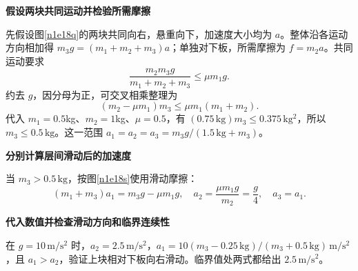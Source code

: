 \begin{solution}\textbf{假设两块共同运动并检验所需摩擦}\par\nobreak
先假设图\ref{n1e18q}的两块共同向右，悬重向下，加速度大小均为 $a$。整体沿各运动方向相加得 $m_3g=(m_1+m_2+m_3)a$；单独对下板，所需摩擦为 $f=m_2a$。共同运动要求
\[
 \frac{m_2m_3g}{m_1+m_2+m_3}\le\mu m_1g.
\]
约去 $g$，因分母为正，可交叉相乘整理为
\[
 (m_2-\mu m_1)m_3\le\mu m_1(m_1+m_2).
\]
代入 $m_1=0.5$kg、$m_2=1$kg、$\mu=0.5$，有 $(0.75\,\mathrm{kg})m_3\le0.375\,\mathrm{kg^2}$，所以 $m_3\le0.5\,\mathrm{kg}$。这一范围 $a_1=a_2=a_3=m_3g/(1.5\,\mathrm{kg}+m_3)$。



\par\medskip{}\noindent\textbf{分别计算层间滑动后的加速度}\par\nobreak
当 $m_3>0.5\,\mathrm{kg}$，按图\ref{n1e18s}使用滑动摩擦：
\[
 (m_1+m_3)a_1=m_3g-\mu m_1g,\quad
 a_2=\frac{\mu m_1g}{m_2}=\frac g4,\quad a_3=a_1.
\]


\par\medskip{}\noindent\textbf{代入数值并检查滑动方向和临界连续性}\par\nobreak
在 $g=10\,\mathrm{m/s^2}$ 时，$a_2=2.5\,\mathrm{m/s^2}$，$a_1=10(m_3-0.25\,\mathrm{kg})/(m_3+0.5\,\mathrm{kg})\,\mathrm{m/s^2}$，且 $a_1>a_2$，验证上块相对下板向右滑动。临界值处两式都给出 $2.5\,\mathrm{m/s^2}$。
\end{solution}

